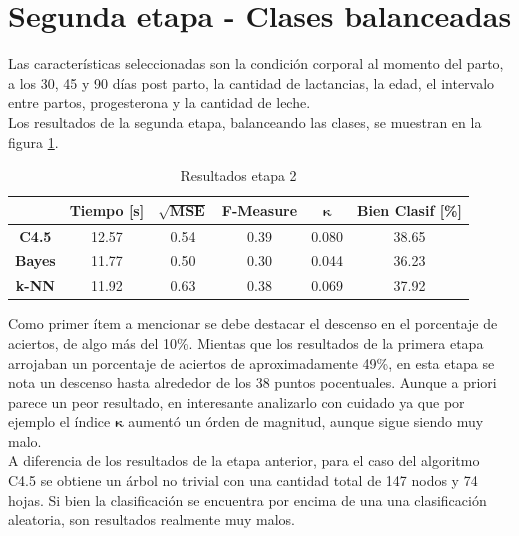\documentclass[12pt,a4paper,titlepage]{report}
\newcommand{\bs}{\boldsymbol}
\begin{document}
\section{Segunda etapa - Clases balanceadas}

Las características seleccionadas son la condición corporal al momento del parto, a los 30, 45 y 90 días post parto, la cantidad de lactancias, la edad, el intervalo entre partos, progesterona y la cantidad de leche. \\

Los resultados de la segunda etapa, balanceando las clases, se muestran en la figura \ref{tab:resultados_etapa2}. 

\begin{table}[H]
\centering
	\begin{tabular}{c|c|c|c|c|c|} 
	\cline{2-6}
	& \multicolumn{1}{c|}{\cellcolor[gray]{0.7} \textbf{Tiempo [s]}}  
	& \multicolumn{1}{c|}{\cellcolor[gray]{0.7} $\mathbf{\sqrt{MSE}}$}
	& \multicolumn{1}{c|}{\cellcolor[gray]{0.7} \textbf{F-Measure}}
	& \multicolumn{1}{c|}{\cellcolor[gray]{0.7} $\bs\kappa$}
	& \multicolumn{1}{c|}{\cellcolor[gray]{0.7} \textbf{Bien Clasif [\%]}} \\ \hline
	
	\multicolumn{1}{|c|}{\cellcolor[gray]{0.8} \textbf{C4.5}}   & 12.57 & 0.54 & 0.39 & 0.080 & \cellcolor[gray]{0.9}38.65  \\ \hline
	\multicolumn{1}{|c|}{\cellcolor[gray]{0.8} \textbf{Bayes}}  & 11.77 & 0.50 & 0.30 & 0.044 & \cellcolor[gray]{0.9}36.23 \\ \hline
	\multicolumn{1}{|c|}{\cellcolor[gray]{0.8} \textbf{k-NN}}   & 11.92 & 0.63 & 0.38 & 0.069 & \cellcolor[gray]{0.9}37.92 \\ \hline
	\end{tabular} 
	\caption{Resultados etapa 2}
	\label{tab:resultados_etapa2}
\end{table}

Como primer ítem a mencionar se debe destacar el descenso en el porcentaje de aciertos, de algo más del 10\%. Mientas que los resultados de la primera etapa arrojaban un porcentaje de aciertos de aproximadamente 49\%, en esta etapa se nota un descenso hasta alrededor de los 38 puntos pocentuales. Aunque a priori parece un peor resultado, en interesante analizarlo con cuidado ya que por ejemplo el índice $\bs\kappa$ aumentó un órden de magnitud, aunque sigue siendo muy malo.\\

A diferencia de los resultados de la etapa anterior, para el caso del algoritmo C4.5 se obtiene un árbol no trivial con una cantidad total de 147 nodos y 74 hojas. Si bien la clasificación se encuentra por encima de una una clasificación aleatoria, son resultados realmente muy malos. \\
\end{document}
